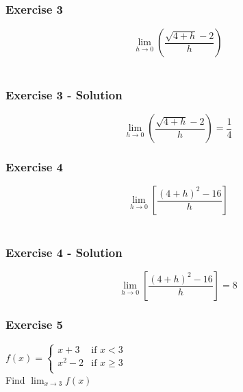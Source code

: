 \documentclass[12pt]{beamer}
\begin{document}
\begin{frame}
	\frametitle{Exercise 3}
	\vspace*{\fill}
	\vspace*{\fill}
	\vspace*{\fill}
	\initclock
	\Large
	\[\displaystyle\lim_{h\to0}\left(\frac{\sqrt{4+h}-2}{h}\right)\]\\
	\vspace*{\fill}
	\vspace*{\fill}
	\vspace*{\fill}
	\vspace*{\fill}
	\crono
\end{frame}
\begin{frame}
	\frametitle{Exercise 3 - Solution}
	\Large
	\[\displaystyle\lim_{h\to0}\left(\frac{\sqrt{4+h}-2}{h}\right) = \boxed{\frac{1}{4}}\]
\end{frame}
\begin{frame}
	\frametitle{Exercise 4}
	\vspace*{\fill}
	\vspace*{\fill}
	\vspace*{\fill}
	\initclock
	\Large
	\[\displaystyle\lim_{h\to0}\left[\frac{(4+h)^2-16}{h}\right]\]\\
	\vspace*{\fill}
	\vspace*{\fill}
	\vspace*{\fill}
	\vspace*{\fill}
	\crono
\end{frame}
\begin{frame}
	\frametitle{Exercise 4 - Solution}
	\Large
	\[\displaystyle\lim_{h\to0}\left[\frac{(4+h)^2-16}{h}\right] = \boxed{8}\]
\end{frame}
\begin{frame}
	\frametitle{Exercise 5}
	\initclock
	\Large
	\begin{center}
		$f(x) =
			\begin{cases}
				x+3   & \text{if } x < 3    \\
				x^2-2 & \text{if } x \geq 3 \\
			\end{cases}$\\
		\vspace*{\fill}
		\vspace*{\fill}
		\vspace*{\fill}
		Find $\displaystyle\lim_{x\to3}f(x)$\\
	\end{center}
	\vspace*{\fill}
	\vspace*{\fill}
	\crono
\end{frame}
\end{document}
